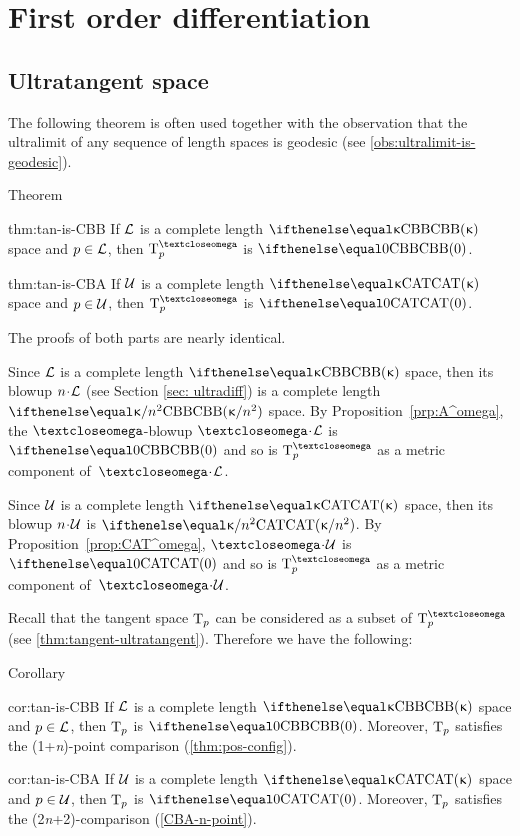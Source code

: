 \chapter{First order differentiation}\label{chap:tan}

\section{Ultratangent space} 

The following theorem is often used together with the 
observation that the ultralimit of any sequence of length spaces is geodesic (see \ref{obs:ultralimit-is-geodesic}).

\begin{thm}{Theorem}\label{thm:tan-is}
\begin{subthm}{thm:tan-is-CBB}
If $\mathcal{L}$ is a complete length  $\Alex{\kappa}$ space and $p\in \spc{L}$, then $\T^\o_p$ is $\Alex{0}$.
\end{subthm}

\begin{subthm}{thm:tan-is-CBA}
If $\mathcal{U}$ is a complete length $\CAT\kappa$ space and $p\in \spc{U}$, then $\T^\o_p$ is $\CAT0$.
\end{subthm}

\end{thm}

The proofs of both parts are nearly identical.

Since $\mathcal{L}$ is a complete length $\Alex{\kappa}$ space, then its blowup $n\cdot\spc{L}$
(see Section \ref{sec: ultradiff})
 is a complete length $\Alex{\kappa/{n^{2}}}$ space.
By Proposition~\ref{prp:A^omega}, the $\o$-blowup $\o\cdot\spc{L}$ is $\Alex0$
and so is $\T_p^\o$ as a metric component of~$\o\cdot\spc{L}$.

Since $\mathcal{U}$ is a complete length $\CAT\kappa$ space, then its blowup $n\cdot\spc{U}$ is $\CAT{\kappa/{n^{2}}}$.
By Proposition~\ref{prop:CAT^omega}, $\o\cdot\spc{U}$ is $\CAT0$
and so is $\T_p^\o$ as a metric component of~$\o\cdot\spc{U}$.
\qeds

Recall that the tangent space $\text{\rm T}_p$ can be considered as a subset of $\T^\o_p$ (see \ref{thm:tangent-ultratangent}).
Therefore we have the following:

\begin{thm}{Corollary}\label{cor:real-tan-is}
\begin{subthm}{cor:tan-is-CBB}
If $\mathcal{L}$ is a complete length $\Alex{\kappa}$ space and $p\in \spc{L}$, then $\text{\rm T}_p$ is $\Alex{0}$.
Moreover, $\text{\rm T}_p$ satisfies the (1+\textit{n})-point comparison (\ref{thm:pos-config}).
\end{subthm}

\begin{subthm}{cor:tan-is-CBA}
If $\mathcal{U}$ is a complete length $\CAT\kappa$ space and $p\in \spc{U}$, then $\text{\rm T}_p$ is $\CAT0$.
Moreover, $\text{\rm T}_p$ satisfies the (2\textit{n}+2)-comparison (\ref{CBA-n-point}).
\end{subthm}

\end{thm}



